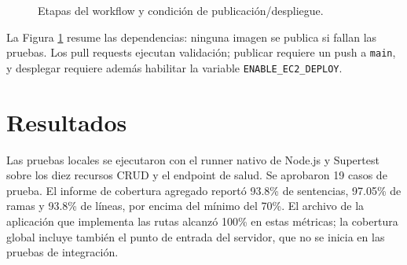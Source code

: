 \documentclass[12pt,letterpaper]{article}
\begin{document}
\begin{figure}[H]
\centering
{}
\caption{Etapas del workflow y condición de publicación/despliegue.}
\label{fig:pipeline}
\end{figure}
La Figura \ref{fig:pipeline} resume las dependencias: ninguna imagen se publica si fallan las pruebas. Los pull requests ejecutan validación; publicar requiere un push a \texttt{main}, y desplegar requiere además habilitar la variable \texttt{ENABLE\_EC2\_DEPLOY}.

\section{Resultados}
Las pruebas locales se ejecutaron con el runner nativo de Node.js y Supertest sobre los diez recursos CRUD y el endpoint de salud. Se aprobaron 19 casos de prueba. El informe de cobertura agregado reportó 93.8\% de sentencias, 97.05\% de ramas y 93.8\% de líneas, por encima del mínimo del 70\%. El archivo de la aplicación que implementa las rutas alcanzó 100\% en estas métricas; la cobertura global incluye también el punto de entrada del servidor, que no se inicia en las pruebas de integración.
\end{document}
